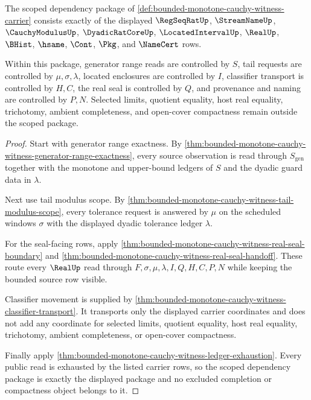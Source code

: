 \begin{theorem}
\label{thm:bounded-monotone-cauchy-witness-scoped-dependency-package}
The scoped dependency package of \autoref{def:bounded-monotone-cauchy-witness-carrier} consists exactly of the displayed $\RegSeqRatUp$, $\StreamNameUp$, $\CauchyModulusUp$, $\DyadicRatCoreUp$, $\LocatedIntervalUp$, $\RealUp$, $\BHist$, $\hsame$, $\Cont$, $\Pkg$, and $\NameCert$ rows.

Within this package, generator range reads are controlled by $S$, tail requests are controlled by $\mu,\sigma,\lambda$, located enclosures are controlled by $I$, classifier transport is controlled by $H,C$, the real seal is controlled by $Q$, and provenance and naming are controlled by $P,N$. Selected limits, quotient equality, host real equality, trichotomy, ambient completeness, and open-cover compactness remain outside the scoped package.
\end{theorem}
\begin{proof}
Start with generator range exactness. By \autoref{thm:bounded-monotone-cauchy-witness-generator-range-exactness}, every source observation is read through $S_{\mathrm{gen}}$ together with the monotone and upper-bound ledgers of $S$ and the dyadic guard data in $\lambda$.

Next use tail modulus scope. By \autoref{thm:bounded-monotone-cauchy-witness-tail-modulus-scope}, every tolerance request is answered by $\mu$ on the scheduled windows $\sigma$ with the displayed dyadic tolerance ledger $\lambda$.

For the seal-facing rows, apply \autoref{thm:bounded-monotone-cauchy-witness-real-seal-boundary} and \autoref{thm:bounded-monotone-cauchy-witness-real-seal-handoff}. These route every $\RealUp$ read through $F,\sigma,\mu,\lambda,I,Q,H,C,P,N$ while keeping the bounded source row visible.

Classifier movement is supplied by \autoref{thm:bounded-monotone-cauchy-witness-classifier-transport}. It transports only the displayed carrier coordinates and does not add any coordinate for selected limits, quotient equality, host real equality, trichotomy, ambient completeness, or open-cover compactness.

Finally apply \autoref{thm:bounded-monotone-cauchy-witness-ledger-exhaustion}. Every public read is exhausted by the listed carrier rows, so the scoped dependency package is exactly the displayed package and no excluded completion or compactness object belongs to it.
\end{proof}

